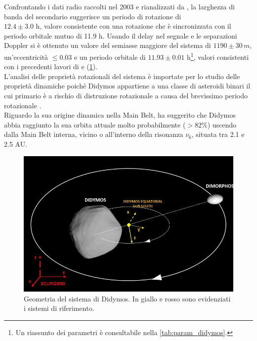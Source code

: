 \documentclass[a4paper,11pt,openright]{book}
\begin{document}
Confrontando i dati radio raccolti nel 2003 e rianalizzati da \citet{naidu_radar_2020}, la larghezza di banda del secondario suggerisce un periodo di rotazione di\\$12.4\pm 3.0$ h, valore consistente con una rotazione che è sincronizzata con il periodo orbitale mutuo di 11.9 h. Usando il delay nel segnale e le separazioni Doppler si è ottenuto un valore del semiasse maggiore del sistema di $1190\pm 30\, m$, un'eccentricità $\leq 0.03$ e un periodo orbitale di $11.93\pm 0.01$ h\footnote{Un riassunto dei parametri è consultabile nella \cref{tab:param_didymos}.}, valori consistenti con i precedenti lavori di \citet{scheirich_modeling_2009} e \citet{fang_near-earth_2012} (\cref{fig:system_orbit}).\\
L'analisi delle proprietà rotazionali del sistema è importate per lo studio delle proprietà dinamiche poiché Didymos appartiene a una classe di asteroidi binari il cui primario è a rischio di distruzione rotazionale a causa del brevissimo periodo rotazionale \citep{walsh_rotational_2008}.\\
Riguardo la sua origine dinamica nella Main Belt, \citet{richardson_dynamical_2016} ha suggerito che Didymos abbia raggiunto la sua orbita attuale molto probabilmente ($>$82\%) uscendo dalla Main Belt interna, vicino o all'interno della risonanza $\nu_6$, situata tra 2.1 e 2.5 AU.

\begin{figure}[!h]
    \centering
    \includegraphics[scale=0.78]{figure/system_orbit.jpg}
    \caption[Geometria del sistema di Didymos.]{Geometria del sistema di Didymos. In giallo e rosso sono evidenziati i sistemi di riferimento. \citep{bottiglieri_applied_2022}}
    \label{fig:system_orbit}
\end{figure}
\end{document}
